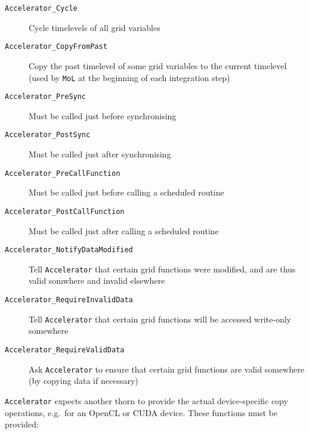 \begin{description}
\item[\texttt{Accelerator\_Cycle}] Cycle timelevels of all grid
  variables
\item[\texttt{Accelerator\_CopyFromPast}] Copy the past timelevel of
  some grid variables to the current timelevel (used by \texttt{MoL}
  at the beginning of each integration step)
\item[\texttt{Accelerator\_PreSync}] Must be called just before
  synchronising
\item[\texttt{Accelerator\_PostSync}] Must be called just after
  synchronising
\item[\texttt{Accelerator\_PreCallFunction}] Must be called just
  before calling a scheduled routine
\item[\texttt{Accelerator\_PostCallFunction}] Must be called just
  after calling a scheduled routine
\item[\texttt{Accelerator\_NotifyDataModified}] Tell
  \texttt{Accelerator} that certain grid functions were modified, and
  are thus valid somwhere and invalid elsewhere
\item[\texttt{Accelerator\_RequireInvalidData}] Tell
  \texttt{Accelerator} that certain grid functions will be accessed
  write-only somewhere
\item[\texttt{Accelerator\_RequireValidData}] Ask \texttt{Accelerator}
  to ensure that certain grid functions are valid somewhere (by
  copying data if necessary)
\end{description}

\texttt{Accelerator} expects another thorn to provide the actual
device-specific copy operations, e.g.\ for an OpenCL or CUDA device.
These functions must be provided:

